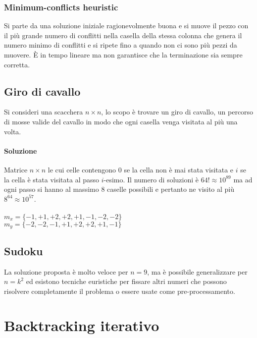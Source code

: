 \subsubsection{Minimum-conflicts heuristic}
Si parte da una soluzione iniziale ragionevolmente buona e si muove il pezzo con il pi\`u grande numero di conflitti nella casella della stessa colonna che genera il numero minimo di 
conflitti e si ripete fino a quando non ci sono pi\`u pezzi da muovere. \`E in tempo lineare ma non garantisce che la terminazione sia sempre corretta.\\

\subsection{Giro di cavallo}
Si consideri una scacchera $n\times n$, lo scopo \`e trovare un giro di cavallo, un percorso di mosse valide del cavallo in modo che ogni casella venga visitata al pi\`u una volta.
\paragraph{Soluzione}
Matrice $n\times n$ le cui celle contengono $0$ se la cella non \`e mai stata visitata e $i$ se la cella \`e stata visitata al passo $i$-esimo. Il numero di soluzioni \`e 
$64!\approx 10^{89}$ ma ad ogni passo si hanno al massimo $8$ caselle possibili e pertanto ne visito al pi\`u $8^{64}\approx 10^{57}$.\\




\mbox{}\\$m_x = \{-1, +1, +2, +2, +1, -1, -2, -2\}$\\
$m_y = \{-2, -2, -1, +1, +2, +2, +1, -1\}$
\newpage
\subsection{Sudoku}
La soluzione proposta \`e molto veloce per $n=9$, ma \`e possibile generalizzare per $n=k^2$ ed esistono tecniche euristiche per fissare altri numeri che possono risolvere completamente
il problema o essere usate come pre-processamento.
\begin{multicols}{2}

\columnbreak

\end{multicols}

\section{Backtracking iterativo}
